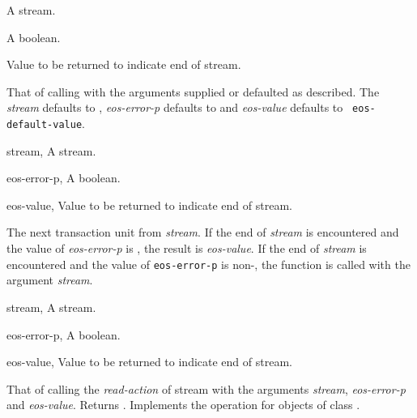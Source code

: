 \begin{optDefinition}
\begin{arguments}
    \item[\optional{stream}] A stream.
    \item[\optional{eos-error-p}] A boolean.
    \item[\optional{eos-value}] Value to be returned to indicate end of stream.
\end{arguments}
%
\result%
That of calling  with the arguments supplied or
defaulted as described.
%
\remarks%
The {\em stream\/} defaults to , {\em
    eos-error-p\/} defaults to \nil{}\/ and {\em eos-value\/} defaults to {\tt
    eos-default-value}.

\begin{genericargs}
    \item[stream, \classref{stream}] A stream.
    \item[eos-error-p, \classref{object}] A boolean.
    \item[eos-value, \classref{object}] Value to be returned to indicate end of
    stream.
\end{genericargs}
%
\result%
The next transaction unit from {\em stream}.
%
\remarks%
If the end of {\em stream\/} is encountered and the value of {\em eos-error-p}
is \nil{}, the result is {\em eos-value\/}. If the end of {\em stream} is
encountered and the value of {\tt eos-error-p} is non-\nil{}, the function
 is called with the argument {\em stream}.

\begin{specargs}
    \item[stream, \classref{stream}] A stream.
    \item[eos-error-p, \classref{object}] A boolean.
    \item[eos-value, \classref{object}] Value to be returned to indicate end of
    stream.
\end{specargs}
%
\result%
That of calling the {\em read-action\/} of stream with the arguments {\em
    stream\/}, {\em eos-error-p\/} and {\em eos-value}.  Returns \true.
%
\remarks%
Implements the  operation for objects of class
.


\end{optDefinition}

